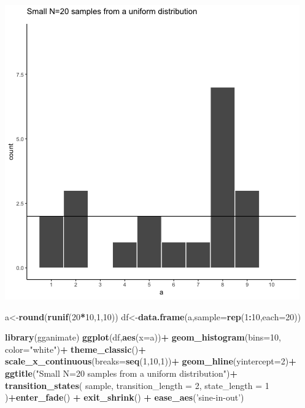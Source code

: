 \documentclass[
]{book}
\newenvironment{Shaded}{\begin{snugshade}}{\end{snugshade}}
\newcommand{\DataTypeTok}[1]{\textcolor[rgb]{0.13,0.29,0.53}{#1}}
\newcommand{\DecValTok}[1]{\textcolor[rgb]{0.00,0.00,0.81}{#1}}
\newcommand{\KeywordTok}[1]{\textcolor[rgb]{0.13,0.29,0.53}{\textbf{#1}}}
\newcommand{\NormalTok}[1]{#1}
\newcommand{\OperatorTok}[1]{\textcolor[rgb]{0.81,0.36,0.00}{\textbf{#1}}}
\newcommand{\StringTok}[1]{\textcolor[rgb]{0.31,0.60,0.02}{#1}}
\begin{document}
\includegraphics{gifs/sampleUnifExpected-1.gif}

\begin{Shaded}
\begin{Highlighting}[]
\NormalTok{a<-}\KeywordTok{round}\NormalTok{(}\KeywordTok{runif}\NormalTok{(}\DecValTok{20}\OperatorTok{*}\DecValTok{10}\NormalTok{,}\DecValTok{1}\NormalTok{,}\DecValTok{10}\NormalTok{))}
\NormalTok{df<-}\KeywordTok{data.frame}\NormalTok{(a,}\DataTypeTok{sample=}\KeywordTok{rep}\NormalTok{(}\DecValTok{1}\OperatorTok{:}\DecValTok{10}\NormalTok{,}\DataTypeTok{each=}\DecValTok{20}\NormalTok{))}


\KeywordTok{library}\NormalTok{(gganimate)}
\KeywordTok{ggplot}\NormalTok{(df,}\KeywordTok{aes}\NormalTok{(}\DataTypeTok{x=}\NormalTok{a))}\OperatorTok{+}
\StringTok{  }\KeywordTok{geom_histogram}\NormalTok{(}\DataTypeTok{bins=}\DecValTok{10}\NormalTok{, }\DataTypeTok{color=}\StringTok{"white"}\NormalTok{)}\OperatorTok{+}
\StringTok{  }\KeywordTok{theme_classic}\NormalTok{()}\OperatorTok{+}
\StringTok{  }\KeywordTok{scale_x_continuous}\NormalTok{(}\DataTypeTok{breaks=}\KeywordTok{seq}\NormalTok{(}\DecValTok{1}\NormalTok{,}\DecValTok{10}\NormalTok{,}\DecValTok{1}\NormalTok{))}\OperatorTok{+}
\StringTok{  }\KeywordTok{geom_hline}\NormalTok{(}\DataTypeTok{yintercept=}\DecValTok{2}\NormalTok{)}\OperatorTok{+}
\StringTok{  }\KeywordTok{ggtitle}\NormalTok{(}\StringTok{"Small N=20 samples from a uniform distribution"}\NormalTok{)}\OperatorTok{+}
\StringTok{  }\KeywordTok{transition_states}\NormalTok{(}
\NormalTok{    sample,}
    \DataTypeTok{transition_length =} \DecValTok{2}\NormalTok{,}
    \DataTypeTok{state_length =} \DecValTok{1}
\NormalTok{  )}\OperatorTok{+}\KeywordTok{enter_fade}\NormalTok{() }\OperatorTok{+}\StringTok{ }
\StringTok{  }\KeywordTok{exit_shrink}\NormalTok{() }\OperatorTok{+}
\StringTok{  }\KeywordTok{ease_aes}\NormalTok{(}\StringTok{'sine-in-out'}\NormalTok{)}
\end{Highlighting}
\end{Shaded}
\end{document}
